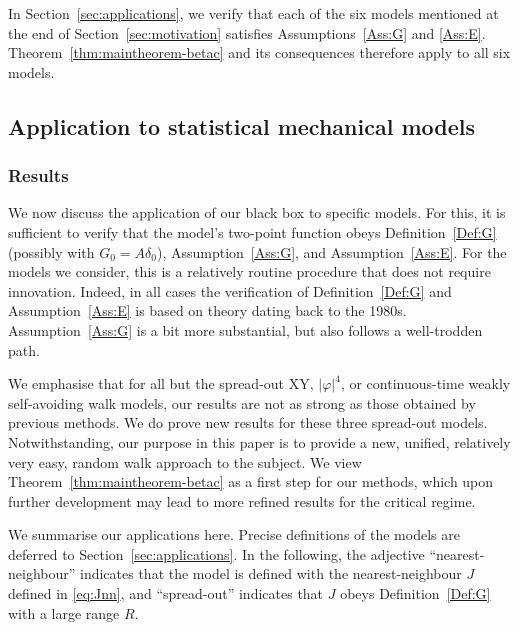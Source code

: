 \documentclass[11pt,a4paper]{article}
\numberwithin{equation}{section}
\theoremstyle{plain}
\theoremstyle{definition}
\newcommand\1{\mathds{1}}
\begin{document}
In Section~\ref{sec:applications}, we verify that each
of the six models mentioned at the end of Section~\ref{sec:motivation}  satisfies Assumptions~\ref{Ass:G} and \ref{Ass:E}.
Theorem~\ref{thm:maintheorem-betac} and its consequences therefore apply to all
six models.



\subsection{Application to statistical mechanical models}
\label{sec:statmech}


\subsubsection{Results}
\label{sec:statmechresults}



We now discuss the application of our black box to specific models.
For this, it is sufficient to verify that the model's
two-point function obeys
Definition~\ref{Def:G} (possibly with $G_0=A\delta_0$), Assumption~\ref{Ass:G}, and Assumption~\ref{Ass:E}.
For the models we consider, this is a relatively routine procedure that does
not require innovation.
Indeed, in all cases the verification of Definition~\ref{Def:G} and Assumption~\ref{Ass:E}
is based on theory dating back to the 1980s.
Assumption~\ref{Ass:G} is a bit more substantial, but also follows a well-trodden path.

We emphasise that for all but the spread-out XY, $|\varphi|^4$,
or continuous-time weakly self-avoiding walk models,
our results are not as strong as those obtained by previous
methods. We do prove new results for
these three spread-out models. Notwithstanding, our
purpose in this paper is to provide a new, unified,
relatively very easy, random walk approach to the subject.
We view Theorem~\ref{thm:maintheorem-betac} as a first
step for our methods, which upon further development may lead to more refined results for the critical regime.

We summarise our applications here.  Precise definitions of the models are
deferred to  Section~\ref{sec:applications}.
In the following, the adjective ``nearest-neighbour'' indicates that the model
is defined with the nearest-neighbour $J$ defined in \eqref{eq:Jnn}, and
``spread-out'' indicates that $J$ obeys Definition~\ref{Def:G} with a large
range $R$.
\end{document}
